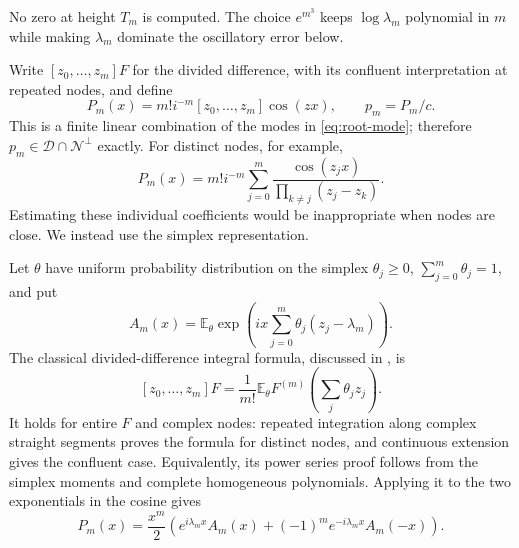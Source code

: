 \documentclass[11pt,a4paper]{article}
\newcommand{\DD}{\mathcal D}
\newcommand{\NN}{\mathcal N}
\newcommand{\Etheta}{\mathbb E_{\theta}}
\theoremstyle{definition}
\theoremstyle{remark}
\numberwithin{equation}{section}
\begin{document}
No zero at height $T_m$ is computed. The choice $e^{m^3}$ keeps
$\log\lambda_m$ polynomial in $m$ while making $\lambda_m$ dominate the
oscillatory error below.

Write $[z_0,\ldots,z_m]F$ for the divided difference, with its confluent
interpretation at repeated nodes, and define
\begin{equation}\label{eq:P}
 P_m(x)=m!i^{-m}[z_0,\ldots,z_m]\cos(zx),\qquad
 p_m=P_m/c.
\end{equation}
This is a finite linear combination of the modes in
\eqref{eq:root-mode}; therefore $p_m\in\DD\cap\NN^\perp$ exactly.
For distinct nodes, for example,
\[
 P_m(x)=m!i^{-m}\sum_{j=0}^m
          \frac{\cos(z_jx)}{\prod_{k\ne j}(z_j-z_k)}.
\]
Estimating these individual coefficients would be inappropriate when nodes
are close. We instead use the simplex representation.

Let $\theta$ have uniform probability distribution on the simplex
$\theta_j\ge0$, $\sum_{j=0}^m\theta_j=1$, and put
\begin{equation}\label{eq:A}
 A_m(x)=\Etheta\exp\left(ix\sum_{j=0}^m\theta_j(z_j-\lambda_m)\right).
\end{equation}
The classical divided-difference integral formula, discussed in
\cite{deboor}, is
\begin{equation}\label{eq:HG}
 [z_0,\ldots,z_m]F
       =\frac1{m!}\Etheta F^{(m)}\left(\sum_j\theta_jz_j\right).
\end{equation}
It holds for entire $F$ and complex nodes: repeated integration along
complex straight segments proves the formula for distinct nodes, and
continuous extension gives the confluent case. Equivalently, its power
series proof follows from the simplex moments and complete homogeneous
polynomials. Applying it to the two exponentials in the cosine gives
\begin{equation}\label{eq:P-simplex}
 P_m(x)=\frac{x^m}{2}\left(
       e^{i\lambda_mx}A_m(x)+(-1)^m e^{-i\lambda_mx}A_m(-x)\right).
\end{equation}
\end{document}
